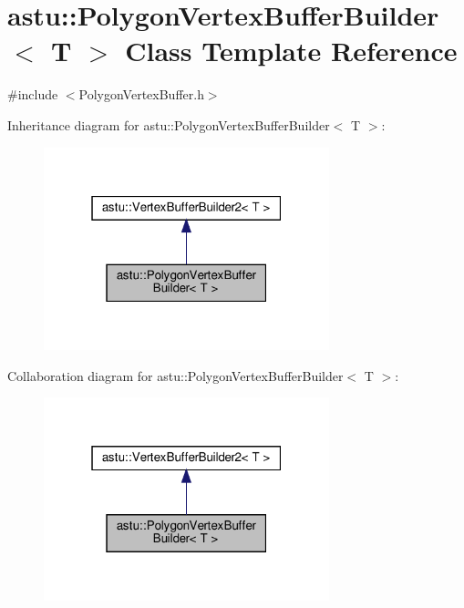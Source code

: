\hypertarget{classastu_1_1PolygonVertexBufferBuilder}{}\section{astu\+:\+:Polygon\+Vertex\+Buffer\+Builder$<$ T $>$ Class Template Reference}
\label{classastu_1_1PolygonVertexBufferBuilder}


{\ttfamily \#include $<$Polygon\+Vertex\+Buffer.\+h$>$}



Inheritance diagram for astu\+:\+:Polygon\+Vertex\+Buffer\+Builder$<$ T $>$\+:\nopagebreak
\begin{figure}[H]
\begin{center}
\leavevmode
\includegraphics[width=235pt]{classastu_1_1PolygonVertexBufferBuilder__inherit__graph}
\end{center}
\end{figure}


Collaboration diagram for astu\+:\+:Polygon\+Vertex\+Buffer\+Builder$<$ T $>$\+:\nopagebreak
\begin{figure}[H]
\begin{center}
\leavevmode
\includegraphics[width=235pt]{classastu_1_1PolygonVertexBufferBuilder__coll__graph}
\end{center}
\end{figure}
